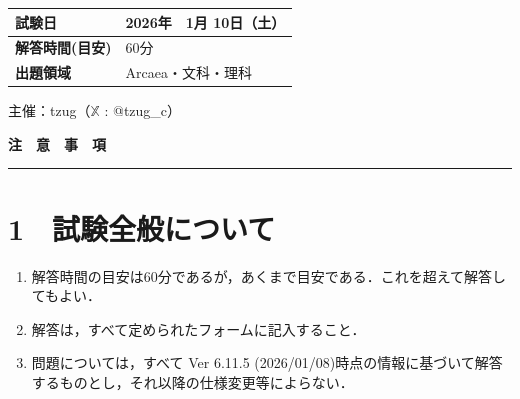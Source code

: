 \documentclass[uplatex,dvipdfmx,paper=a4paper,fontsize=11pt,jafontscale=0.9247,lang=ja]{jlreq}
\begin{document}
\thispagestyle{coverpage}
\begin{center}

\vspace*{3cm}


\vspace{3cm}

\renewcommand{\arraystretch}{1.8}
\begin{tabular}{|>{\centering\arraybackslash}p{3.5cm}|>{\centering\arraybackslash}p{7cm}|}
\hline
\textbf{試験日} & 2026年　1月 10日（土） \\
\hline
\textbf{解答時間(目安)} & 60分 \\
\hline
\textbf{出題領域} & Arcaea・文科・理科 \\
\hline
\end{tabular}

\vspace{4cm}

\vspace{2cm}

{\large 主催：tzug（$\mathbb{X}$ : @tzug\_c）}

\end{center}

\newpage
\thispagestyle{instructionpage}

\begin{center}
{\LARGE\textbf{注　意　事　項}}\\[0.5em]
\rule{0.7\textwidth}{1pt}
\end{center}

\vspace{1.5em}

\section*{1　試験全般について}
\begin{enumerate}
  \item 解答時間の目安は60分であるが，あくまで目安である．これを超えて解答してもよい．
  \item 解答は，すべて定められたフォームに記入すること．
  \item 問題については，すべて Ver 6.11.5 (2026/01/08)時点の情報に基づいて解答するものとし，それ以降の仕様変更等によらない．
\end{enumerate}
\end{document}
